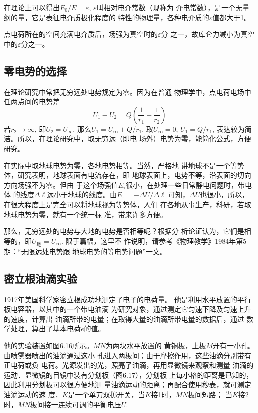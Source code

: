 在理论上可以得出$E_0/E=\varepsilon$, $\varepsilon$叫相对电介常数（现称为
介电常数），是一个无量纲的量，它是表征电介质极化程度的
特性的物理量，各种电介质的$\varepsilon$值都大于1。

点电荷所在的空间充满电介质后，场强为真空时的$\varepsilon$分
之一，故库仑力减小为真空中的$\varepsilon$分之一。

\subsection{零电势的选择}
在理论研究中常把无穷远处电势规定为零。因为在普通
物理学中，点电荷电场中任两点间的电势差
\[U_1-U_2=Q\left(\frac{1}{r_1}-\frac{1}{r_2}\right)\]
若$r_2\to \infty$, 即$U_2=U_{\infty}$, 那么$U_1=U_{\infty}+Q/r_1$. 取$U_{\infty}=0$, $U_1=Q/r_1$, 表达较为简洁。所以，在理论研究中，取无穷远（即电
场外）电势为零，能简化公式，方便研究。

在实际中取地球电势为零，各地电势相等。当然，严格地
讲地球不是一个等势体，研究表明，地球表面有电流存在，即
地球表面上，电势不等，沿表面的切向方向场强不为零。但由
于这个场强值$E_{\tau}$很小，在处理一些日常静电问题时，带电体
的线度$\Delta \ell$远小于地球的线度。由$E_{\tau}=-\Delta U/\Delta \ell$
可知，$\Delta U$也很小，所以，在很大程度上是完全可以将地球视为等势体，人们
在各地从事生产，科研，若取地球电势为零，就有一个统一标
准，带来许多方便。

那么，无穷远处的电势与大地的电势是否相等呢？根据分
析论证认为，它们是相等的，即$U_{\text{地}}=U_{\infty}$. 限于篇幅，这里不
作说明，请参考《物理教学》1984年第5期：“无限远处电势跟
地球电势的等电势问题”一文。

\subsection{密立根油滴实验}
1917年美国科学家密立根成功地测定了电子的电荷量。
他是利用水平放置的平行板电容器，以其中的一个带电油滴
为研究对象，通过测定它匀速下降及匀速上升的速度，计算出
油滴所带的电量；在取得大量的油滴所带电量的数据后，通过
数学处理，算出了基本电荷$e$的值。

他的实验装置如图6.16所示。$MN$为两块水平放置的
黄铜板，上板$M$开有一小孔。由喷雾器喷出的油滴通过这小
孔进入两板间；由于摩擦作用，这些油滴分别带有正电荷或负
电荷。光源发出的光，照亮了油滴，再用显微镜来观察和测量
油滴的运动．显微镜的目镜中装有分划板（图6.17），分划板
上每小格的距离是已知的，因此利用分划板可以很方便地测
量油滴运动的距离；再配合使用秒表，就可测定油滴运动的速
度．$K$是一个单刀双掷开关，当$K$接1时，$MN$板间短路；
当$K$接2时，$MN$板间接一连续可调的平衡电压$U$.

